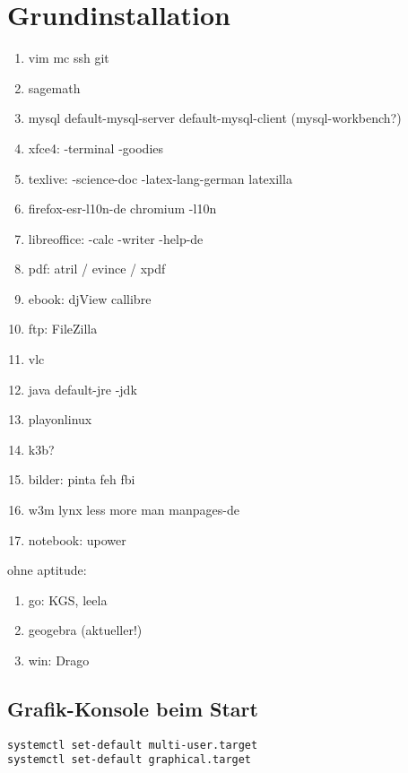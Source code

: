 \section{Grundinstallation}

\begin{enumerate}
\item vim mc ssh git
\item sagemath
\item mysql default-mysql-server default-mysql-client (mysql-workbench?)
\item xfce4: -terminal -goodies 
\item texlive: -science-doc -latex-lang-german  latexilla
\item firefox-esr-l10n-de    chromium  -l10n
\item libreoffice: -calc -writer -help-de
\item pdf: atril / evince / xpdf
\item ebook: djView callibre
\item ftp: FileZilla
\item vlc
\item java default-jre -jdk
\item playonlinux
\item k3b?
\item bilder: pinta feh fbi
\item w3m lynx less more man manpages-de
\item notebook: upower
\end{enumerate}

ohne aptitude:

\begin{enumerate}
\item go: KGS, leela
\item geogebra (aktueller!)
\item win: Drago
\end{enumerate}



\subsection{Grafik-Konsole beim Start}

\begin{verbatim}
systemctl set-default multi-user.target
systemctl set-default graphical.target
\end{verbatim}
